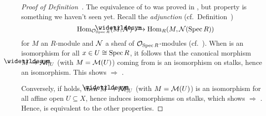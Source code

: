 \documentclass[a4paper,parskip=half,numbers=enddot, DIV=12]{scrreprt}
\begin{document}
\begin{proof}[Proof of Definition~]
	 The equivalence of   to  was proved in \cite[Proposition~1.5.1]{alggeo1}, but property  is something we haven't seen yet. Recall the \emph{adjunction} (cf.\ Definition~)
	\begin{align}\lbl{eq:ROXAdjunction}
		\Hom_{\Oo_{\Spec R}}(\snake{M}, \Nn)\isomorphism\Hom_R(M,\Nn(\Spec R))
	\end{align}
	for $M$ an $R$-module and $\mathcal{N}$ a sheaf of $\mathcal{O}_{\operatorname{Spec} R}$-modules (cf.\ \cite[Proposition~1.4.3]{alggeo1}). When  is an isomorphism for all $x\in U\cong\operatorname{Spec} R$, it follows that the canonical morphism $\snake{M}\morphism\Mm|_U$ (with $M=\mathcal{M}(U)$) coming from  is an isomorphism on stalks, hence an isomorphism. This shows  $\Rightarrow$ .
	
	Conversely, if  holds, then $\snake{M}\morphism\Mm|_U$ (with $M=\mathcal{M}(U)$) is an isomorphism for all affine open $U\subseteq X$, hence induces isomorphisms on stalks, which shows  $\Rightarrow$ . Hence,  is equivalent to the other properties.
\end{proof}
\end{document}
